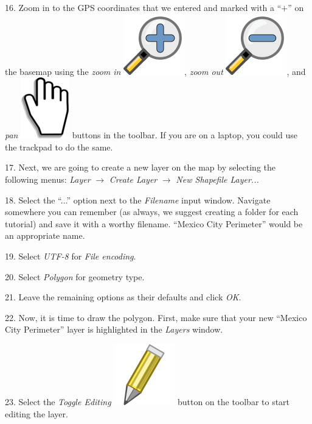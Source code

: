 \documentclass[oneside,a4paper,11pt,explicit]{book}
\begin{document}
16. Zoom in to the GPS coordinates that we entered and marked with a ``$+$'' on the basemap using the \textit{zoom in} \includegraphics[height=\fontcharht\font`\B]{mActionZoomIn.png}, \textit{zoom out} \includegraphics[height=\fontcharht\font`\B]{mActionZoomOut.png}, and \textit{pan} \includegraphics[height=\fontcharht\font`\B]{mActionPan.png} buttons in the toolbar. If you are on a laptop, you could use the trackpad to do the same.

17. Next, we are going to create a new layer on the map by selecting the following menus: \textit{Layer} $\rightarrow$ \textit{Create Layer} $\rightarrow$ \textit{New Shapefile Layer...}

18. Select the ``...'' option next to the \textit{Filename} input window. Navigate somewhere you can remember (as always, we suggest creating a folder for each tutorial) and save it with a worthy filename. ``Mexico City Perimeter'' would be an appropriate name. 

19. Select \textit{UTF-8} for \textit{File encoding}.

20. Select \textit{Polygon} for geometry type. 

21. Leave the remaining options as their defaults and click \textit{OK}.

22. Now, it is time to draw the polygon. First, make sure that your new ``Mexico City Perimeter'' layer is highlighted in the \textit{Layers} window. 

23. Select the \textit{Toggle Editing} \includegraphics[height=\fontcharht\font`\B]{mActionToggleEditing.png} button on the toolbar to start editing the layer. 
\end{document}
